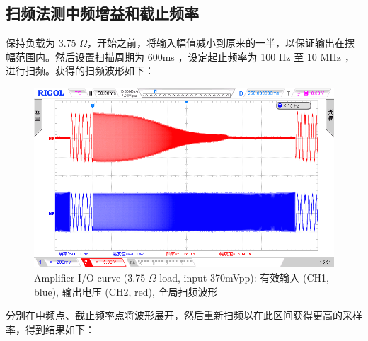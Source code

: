 \documentclass[UTF8]{article}
\begin{document}
\subsection{扫频法测中频增益和截止频率}

保持负载为 3.75 $\Omega$，开始之前，将输入幅值减小到原来的一半，以保证输出在摆幅范围内。然后设置扫描周期为 600ms ，设定起止频率为 100 Hz 至 10 MHz ，进行扫频。获得的扫频波形如下：


\begin{figure}[H]\centering
    \includegraphics[width=\columnwidth]{LCE-03-功率放大器/assets/实验照片/3R5扫频测试 (输入减半 370 mVpp).png}
    \caption{Amplifier I/O curve (3.75 $\Omega$ load, input 370mVpp): 有效输入 (CH1, blue), 输出电压 (CH2, red), 全局扫频波形}
\end{figure}

分别在中频点、截止频率点将波形展开，然后重新扫频以在此区间获得更高的采样率，得到结果如下：
\end{document}
